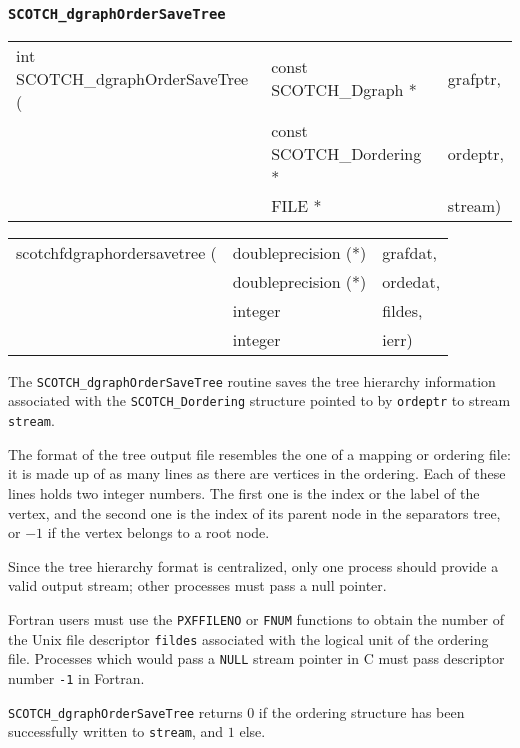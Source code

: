 \subsubsection{{\tt SCOTCH\_dgraphOrderSaveTree}}

\begin{itemize}
\progsyn

{\tt\begin{tabular}{l@{}ll}
int SCOTCH\_dgraphOrderSaveTree ( & const SCOTCH\_Dgraph *    & grafptr, \\
                                  & const SCOTCH\_Dordering * & ordeptr, \\
                                  & FILE *                    & stream)
\end{tabular}}

{\tt\begin{tabular}{l@{}ll}
scotchfdgraphordersavetree ( & doubleprecision (*) & grafdat, \\
                             & doubleprecision (*) & ordedat, \\
                             & integer             & fildes,  \\
                             & integer             & ierr)
\end{tabular}}

\progdes

The {\tt SCOTCH\_dgraphOrderSaveTree} routine saves the tree
hierarchy information associated with the {\tt SCOTCH\_\lbt Dordering}
structure pointed to by {\tt ordeptr} to stream {\tt stream}.

The format of the tree output file resembles the one of a mapping or
ordering file: it is made up of as many lines as there are vertices in
the ordering. Each of these lines holds two integer numbers. The first
one is the index or the label of the vertex, and the second one is the
index of its parent node in the separators tree, or $-1$ if the vertex
belongs to a root node.

Since the tree hierarchy format is centralized, only one process
should provide a valid output stream; other processes must pass a
null pointer.

Fortran users must use the {\tt PXFFILENO} or {\tt FNUM} functions to
obtain the number of the Unix file descriptor {\tt fildes} associated
with the logical unit of the ordering file. Processes which would pass
a {\tt NULL} stream pointer in C must pass descriptor number {\tt -1}
in Fortran.

\progret

{\tt SCOTCH\_dgraphOrderSaveTree} returns $0$ if the ordering structure
has been successfully written to {\tt stream}, and $1$ else.
\end{itemize}

